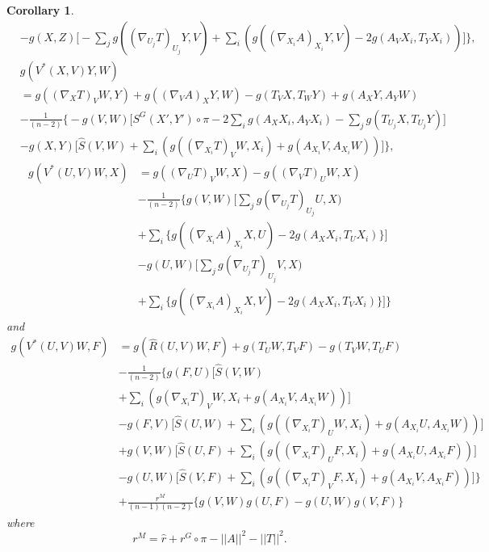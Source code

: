 \documentclass{birkjour}
\newtheorem{corollary}[theorem]{Corollary}
\theoremstyle{definition}
\theoremstyle{remark}
\numberwithin{equation}{section}
\begin{document}
\begin{corollary}
\begin{align*}
		&-g(X,Z) \bigg[-\sum_{j} g((\nabla_{U_j} T)_{U_j} Y, V)
		+ \sum_{i}\left(g((\nabla_{X_i}A)_{X_i} Y,V  ) - 2 g (A_V X_i, T_Y X_i) \right) \bigg] \Bigg\},
	\end{align*}
	\begin{align*}
		&g(V^* (X,V)Y ,W)\\
		&=g((\nabla_X T)_V W, Y) + g((\nabla_V A)_X Y,W)- g(T_V X, T_W Y) + g(A_X Y, A_Y W)\\
		&-\frac{1}{(n-2)} \bigg\{ - g(V,W) \Big[ S^G (X', Y') \circ \pi
		- 2 \sum_{i} g(A_X X_i, A_Y X_i) -\sum_{j} g(T_{U_j}X, T_{U_j}Y) \Big]\\
		&- g(X,Y) \Big[\hat{S} (V,W) + \sum_{i}\left(g((\nabla_{X_i}T)_V W,X_i)
		+ g(A_{X_i} V, A_{X_i}W)  \right) \Big] \bigg\},
	\end{align*}
	\begin{align*}
		g(V^* (U,V)W ,X)&= g((\nabla_U T)_V W, X) - g((\nabla_V T)_U W, X)\\
		&- \frac{1}{(n-2)} \bigg\{g(V,W) \Big[\sum_{j} g(\nabla_{U_j}T)_{U_j}U,X)  \\
		&+ \sum_{i} \{g((\nabla_{X_i}A)_{X_i} X,U)-2g(A_X {X_i}, T_U X_i)\}\Big] \\
		&- g(U,W)  \Big[\sum_{j} g(\nabla_{U_j}T)_{U_j}V,X)  \\
		&+ \sum_{i} \{g((\nabla_{X_i}A)_{X_i} X,V)-2g(A_X {X_i}, T_V X_i)\}\Big] \bigg\}
	\end{align*}
	and
	\begin{align*}
		g(V^* (U,V)W ,F)&=g(\hat{R} (U,V)W, F) + g(T_U W, T_V F) - g(T_V W, T_U F ) \\
		&- \frac{1}{(n-2)} \bigg\{ g(F,U) \Big[ \hat{S}(V,W) \\
		&+ \sum_{i}\left(g(\nabla_{X_i}T)_V W, {X_i}+ g(A_{X_i}V, A_{X_i}W)\right)  \Big] \\
		&-g(F,V) \Big[ \hat{S}(U,W) + \sum_{i} \left(g((\nabla_{X_i}T)_U W, X_i)+ g(A_{X_i}U, A_{X_i}W) \right)\Big]\\
		&+g(V,W) \Big[\hat{S}(U,F) + \sum_{i}\left(g((\nabla_{X_i}T)_U F, X_i)+g(A_{X_i}U,A_{X_i}F)\right)\Big]\\
		&-g(U,W) \Big[\hat{S}(V,F) + \sum_{i}\left(g((\nabla_{X_i}T)_V F, X_i)+ g(A_{X_i} V, A_{X_i}F)\right)\Big] \bigg\}\\
		&+\frac{r^M}{(n-1)(n-2)} \{g(V,W)g(U,F)-g(U,W)g(V,F)\}
	\end{align*}
	where
	\begin{equation*}
	r^M= \hat{r}+r^G \circ \pi - ||A||^2- ||T||^2.
	\end{equation*}
\end{corollary}
\end{document}
